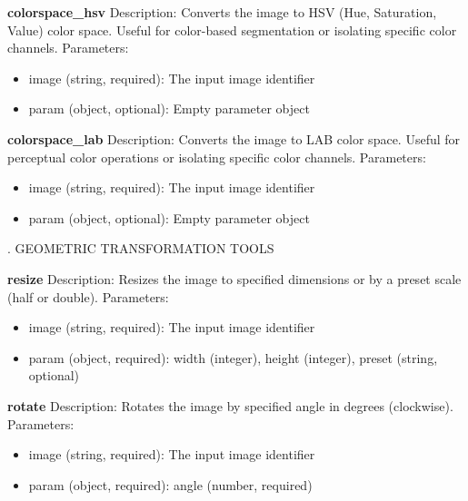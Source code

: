 \documentclass[runningheads]{llncs}
\begin{document}
\begin{tcolorbox}
\noindent \textbf{colorspace\_hsv}
\newline Description: Converts the image to HSV (Hue, Saturation, Value) color space. Useful for color-based segmentation or isolating specific color channels.
\newline Parameters:
\begin{itemize}
    \item image (string, required): The input image identifier
    \item param (object, optional): Empty parameter object
\end{itemize}

\noindent \textbf{colorspace\_lab}
\newline Description: Converts the image to LAB color space. Useful for perceptual color operations or isolating specific color channels.
\newline Parameters:
\begin{itemize}
    \item image (string, required): The input image identifier
    \item param (object, optional): Empty parameter object
\end{itemize}

\vspace{4mm}
. GEOMETRIC TRANSFORMATION TOOLS
\vspace{2mm}

\noindent \textbf{resize}
\newline Description: Resizes the image to specified dimensions or by a preset scale (half or double).
\newline Parameters:
\begin{itemize}
    \item image (string, required): The input image identifier
    \item param (object, required): width (integer), height (integer), preset (string, optional)
\end{itemize}

\noindent \textbf{rotate}
\newline Description: Rotates the image by specified angle in degrees (clockwise).
\newline Parameters:
\begin{itemize}
    \item image (string, required): The input image identifier
    \item param (object, required): angle (number, required)
\end{itemize}


\end{tcolorbox}
\end{document}

